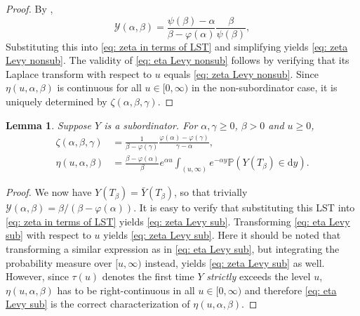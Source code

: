\documentclass[reqno,12pt]{amsart}
\newtheorem{lemma}{Lemma}
\begin{document}
\begin{proof}
    By \cite[Equation (15.5)]{DM},
    \begin{equation*}
        \mathscr{Y}(\alpha,\beta) = \frac{\psi(\beta) - \alpha}{\beta - \varphi(\alpha)}\frac{\beta}{\psi(\beta)},
    \end{equation*}
  Substituting this into \eqref{eq: zeta in terms of LST} and simplifying yields \eqref{eq: zeta Levy nonsub}. The validity of \eqref{eq: eta Levy nonsub} follows by verifying that its Laplace transform with respect to $u$ equals \eqref{eq: zeta Levy nonsub}. Since $\eta(u,\alpha,\beta)$ is continuous for all $u \in [0,\infty)$ in the non-subordinator case, it is uniquely determined by $\zeta(\alpha,\beta,\gamma)$.
\end{proof}

\begin{lemma}\label{lemma: eta and zeta Levy subord}
    Suppose $Y$ is a subordinator. For $\alpha, \gamma \geqslant0$, $\beta>0$ and $u\geqslant0$,
    \begin{align}\label{eq: zeta Levy sub}
        \zeta(\alpha, \beta, \gamma) &= \frac{1}{\beta - \varphi(\gamma)} \frac{\varphi(\alpha) - \varphi(\gamma)}{\gamma - \alpha},\\
    \label{eq: eta Levy sub}
        \eta(u,\alpha,\beta) &= \frac{\beta - \varphi(\alpha)}{\beta}e^{\alpha u}\int_{(u,\infty)} e^{-\alpha y}\mathbb{P}(Y(T_\beta)\in\mathrm{d}y).
    \end{align}
\end{lemma}
\begin{proof}
    We now have $Y(T_\beta) = \bar{Y}(T_\beta)$, so that trivially $ \mathscr{Y}(\alpha,\beta) = {\beta}/({\beta - \varphi(\alpha)})$.
    It is easy to verify that substituting this LST into \eqref{eq: zeta in terms of LST}  yields \eqref{eq: zeta Levy sub}. Transforming \eqref{eq: eta Levy sub} with respect to $u$ yields \eqref{eq: zeta Levy sub}. Here it should be noted that transforming a similar expression as in \eqref{eq: eta Levy sub}, but integrating the probability measure over $[u,\infty)$ instead, yields \eqref{eq: zeta Levy sub} as well. However, since $\tau(u)$ denotes the first time $Y$ \textit{strictly} exceeds the level $u$, $\eta(u,\alpha,\beta)$ has to be right-continuous in all $u\in[0,\infty)$ and therefore \eqref{eq: eta Levy sub} is the correct characterization of $\eta(u,\alpha,\beta)$.
\end{proof}
\end{document}
